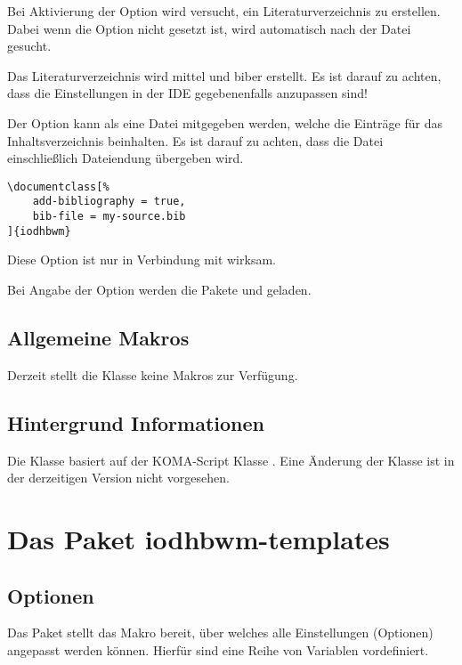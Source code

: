 \documentclass[babel=ngerman,highlight=false]{skdoc}
\begin{document}
            Bei Aktivierung der Option wird versucht, ein Literaturverzeichnis zu erstellen. Dabei wenn die Option  nicht gesetzt ist, wird automatisch nach der Datei  gesucht.
            
            Das Literaturverzeichnis wird mittel  und biber erstellt. Es ist darauf zu achten, dass die Einstellungen in der IDE gegebenenfalls anzupassen sind!\medskip

            Der Option kann als  eine Datei mitgegeben werden, welche die Einträge für das Inhaltsverzeichnis beinhalten. Es ist darauf zu achten, dass die Datei einschließlich Dateiendung übergeben wird.
            \begin{verbatim}
\documentclass[%
    add-bibliography = true,
    bib-file = my-source.bib
]{iodhbwm}
            \end{verbatim}
Diese Option ist nur in Verbindung mit  wirksam.\medskip

            Bei Angabe der Option werden die Pakete  und  geladen.
            
        \subsection{Allgemeine Makros}
            Derzeit stellt die Klasse keine Makros zur Verfügung.
            
        \subsection{Hintergrund Informationen}
            Die Klasse basiert auf der KOMA-Script Klasse . Eine Änderung der Klasse ist in der derzeitigen Version \theversion{} nicht vorgesehen.

    \section{Das Paket iodhbwm-templates}\label{pkg:iodhbwm-templates}
        \subsection{Optionen}\label{pkg:options}
            Das Paket stellt das Makro \Macro{} bereit, über welches alle Einstellungen (Optionen) angepasst werden können. Hierfür sind eine Reihe von  Variablen vordefiniert.\medskip
            
\end{document}
